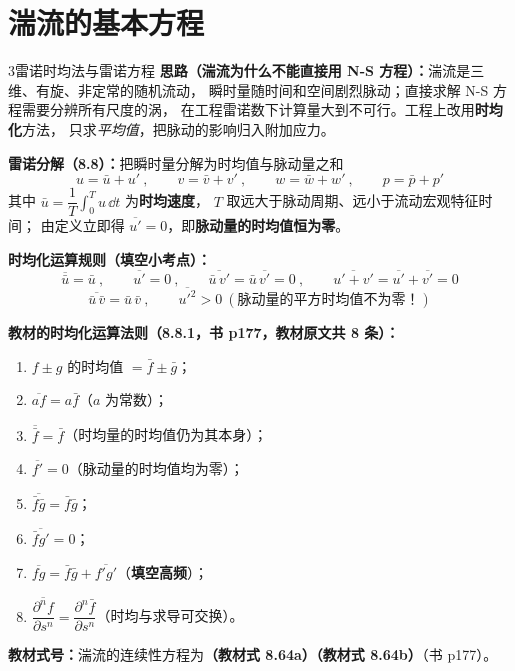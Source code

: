 \section{湍流的基本方程}

\begin{kaodian}{3}{雷诺时均法与雷诺方程}
\textbf{思路（湍流为什么不能直接用 N-S 方程）：}湍流是三维、有旋、非定常的随机流动，
瞬时量随时间和空间剧烈脉动；直接求解 N-S 方程需要分辨所有尺度的涡，
在工程雷诺数下计算量大到不可行。工程上改用\textbf{时均化}方法，
只求\emph{平均值}，把脉动的影响归入附加应力。

\textbf{雷诺分解（8.8）：}把瞬时量分解为时均值与脉动量之和
\[ u=\bar u+u'\ ,\qquad v=\bar v+v'\ ,\qquad w=\bar w+w'\ ,\qquad p=\bar p+p' \]
其中 $\bar u=\dfrac{1}{T}\displaystyle\int_0^T u\,\dd t$ 为\textbf{时均速度}，
$T$ 取远大于脉动周期、远小于流动宏观特征时间；
由定义立即得 $\overline{u'}=0$，即\textbf{脉动量的时均值恒为零}。

\textbf{时均化运算规则（填空小考点）：}
\[ \overline{\bar u}=\bar u\ ,\qquad \overline{u'}=0\ ,\qquad
   \overline{\bar u\,v'}=\bar u\,\overline{v'}=0\ ,\qquad
   \overline{u'+v'}=\overline{u'}+\overline{v'}=0 \]
\[ \overline{\bar u\,\bar v}=\bar u\,\bar v\ ,\qquad
   \overline{u'^2}>0\ (\text{脉动量的平方时均值不为零！}) \]

\textbf{教材的时均化运算法则（8.8.1，书 p177，教材原文共 8 条）：}
\begin{enumerate}
  \item $f\pm g$ 的时均值 $=\bar f\pm\bar g$；
  \item $\overline{af}=a\bar f$（$a$ 为常数）；
  \item $\overline{\bar f}=\bar f$（时均量的时均值仍为其本身）；
  \item $\overline{f'}=0$（脉动量的时均值均为零）；
  \item $\overline{\bar f\bar g}=\bar f\bar g$；
  \item $\overline{\bar f g'}=0$；
  \item $\overline{fg}=\bar f\bar g+\overline{f'g'}$（\textbf{填空高频}）；
  \item $\overline{\dfrac{\partial^n f}{\partial s^n}}=\dfrac{\partial^n\bar f}{\partial s^n}$（时均与求导可交换）。
\end{enumerate}
\textbf{教材式号：}湍流的连续性方程为\textbf{（教材式 8.64a）（教材式 8.64b）}（书 p177）。


\end{kaodian}

